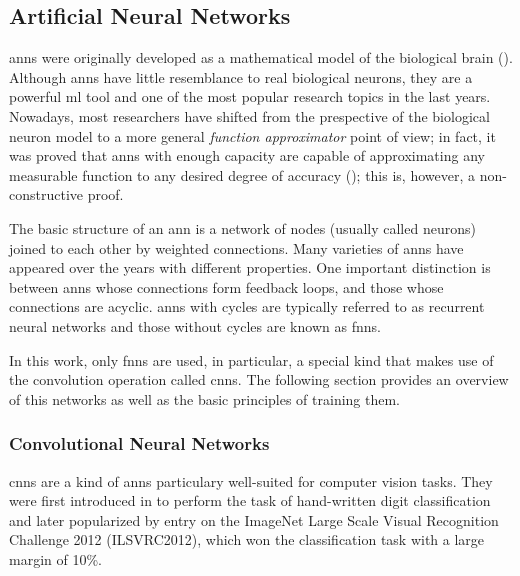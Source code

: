 \documentclass[../main.tex]{subfiles}
\begin{document}
\subsection{Artificial Neural Networks}
\label{sec:artificial-neural-networks}

\glspl{ann} were originally developed as a mathematical model of the biological brain
(\cite{McCulloch1943,Rosenblatt58theperceptron,Rumelhart1987}).
Although \glspl{ann} have little resemblance to real biological neurons, they are
a powerful \gls{ml} tool and one of the most popular research topics in the last years.
Nowadays, most researchers have shifted from the prespective of the biological
neuron model to a more general \emph{function approximator} point of view;
in fact, it was proved that \glspl{ann} with enough capacity are capable of
approximating any measurable function to any desired degree of accuracy
(\cite{Cybenko1989,Hornik1991251}); this is, however, a non-constructive proof.

The basic structure of an \gls{ann} is a network of nodes (usually called neurons)
joined to each other by weighted connections.
Many varieties of \glspl{ann} have appeared over the years with different properties.
One important distinction is between \glspl{ann} whose connections form
feedback loops, and those whose connections are acyclic.
\glspl{ann} with cycles are typically referred to as recurrent neural networks
and those without cycles are known as \glspl{fnn}.

In this work, only \glspl{fnn} are used, in particular, a special kind that makes
use of the convolution operation called \glspl{cnn}.
The following section provides an overview of this networks as well as the
basic principles of training them.

\subsubsection{Convolutional Neural Networks}
\glspl{cnn} are a kind of \glspl{ann} particulary well-suited for computer vision
tasks. They were first introduced in \cite{LeCun1998} to perform the task of
hand-written digit classification and later popularized by \cite{Krizhevsky2012}
entry on the ImageNet Large Scale Visual Recognition Challenge 2012
(ILSVRC2012)\footnotemark, which won the classification task with a large
margin of 10\%.
\end{document}
